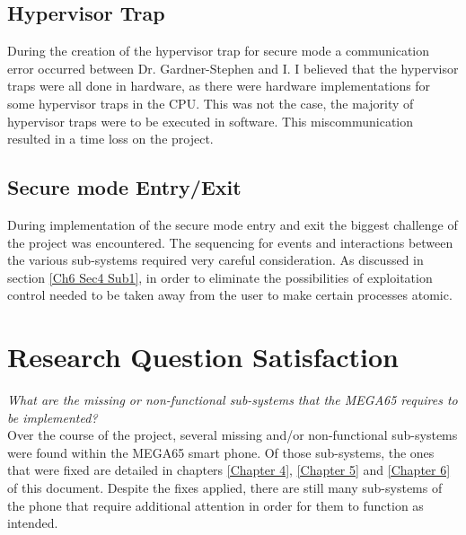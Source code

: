 \subsection{Hypervisor Trap}

\label{Ch7 Sec2 Sub2}

During the creation of the hypervisor trap for secure mode a communication error occurred between Dr. Gardner-Stephen and I. I believed that the hypervisor traps were all done in hardware, as there were hardware implementations for some hypervisor traps in the CPU. This was not the case, the majority of hypervisor traps were to be executed in software. This miscommunication resulted in a time loss on the project.

\subsection{Secure mode Entry/Exit}

\label{Ch7 Sec2 Sub3}

During implementation of the secure mode entry and exit the biggest challenge of the project was encountered. The sequencing for events and interactions between the various sub-systems required very careful consideration. As discussed in section \ref{Ch6 Sec4 Sub1}, in order to eliminate the possibilities of exploitation control needed to be taken away from the user to make certain processes atomic.


\section{Research Question Satisfaction}

\label{Ch7 Sec3}

\textit{What are the missing or non-functional sub-systems that the MEGA65 requires to be implemented?}\\
Over the course of the project, several missing and/or non-functional sub-systems were found within the MEGA65 smart phone. 
Of those sub-systems, the ones that were fixed are detailed in chapters \ref{Chapter 4}, \ref{Chapter 5} and \ref{Chapter 6} of this document. 
Despite the fixes applied, there are still many sub-systems of the phone that require additional attention in order for them to function as intended.\\

